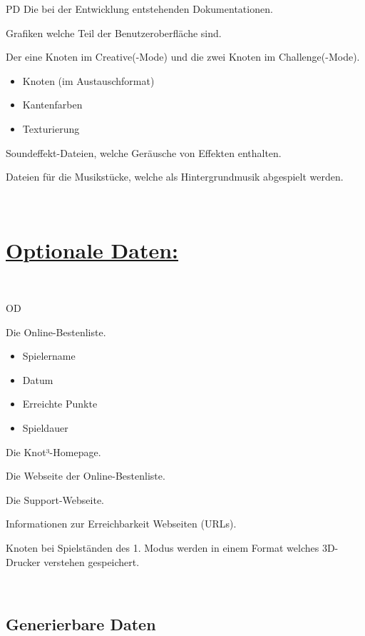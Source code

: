 \begin{ids}{\gls{PD}}
	 \id[80] Die bei der  Entwicklung entstehenden Dokumentationen.
	 
	 \id[90] Grafiken welche Teil der Benutzeroberfläche sind.
	 
	 \id[100] Der eine Knoten im Creative(-Mode) und die zwei Knoten im Challenge(-Mode).
     \begin{itemize}
       \item Knoten (im Austauschformat)
       \item Kantenfarben
       \item Texturierung
     \end{itemize}
  
	 \id[110] Soundeffekt-Dateien, welche Geräusche von Effekten enthalten.
	 
	 \id[120] Dateien für die Musikstücke, welche als Hintergrundmusik abgespielt werden.

\end{ids}
~\\
\section*{\underline{Optionale Daten:}}~\\
\begin{ids}{\gls{OD}}

	\id[10] Die Online-Bestenliste.
	 \begin{itemize}
       \item Spielername
       \item Datum
       \item Erreichte Punkte
       \item Spieldauer
     \end{itemize}
     
     \id[20] Die Knot³-Homepage.
     
     \id[30] Die Webseite der Online-Bestenliste.
     
     \id[40] Die Support-Webseite.
     
     \id[50] Informationen zur Erreichbarkeit Webseiten (URLs).
     
     \id[60] Knoten bei Spielständen des 1. Modus werden in einem Format welches 3D-Drucker verstehen gespeichert.
     
\end{ids}
~\\


\subsection{Generierbare Daten}










